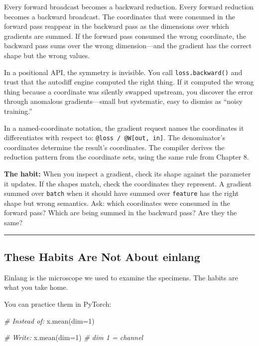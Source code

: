 \documentclass[11pt,]{article}
\newenvironment{Shaded}{}{}
\newcommand{\CommentTok}[1]{\textcolor[rgb]{0.38,0.63,0.69}{\textit{#1}}}
\newcommand{\DecValTok}[1]{\textcolor[rgb]{0.25,0.63,0.44}{#1}}
\newcommand{\NormalTok}[1]{#1}
\newcommand{\OperatorTok}[1]{\textcolor[rgb]{0.40,0.40,0.40}{#1}}
\begin{document}
Every forward broadcast becomes a backward reduction. Every forward
reduction becomes a backward broadcast. The coordinates that were
consumed in the forward pass reappear in the backward pass as the
dimensions over which gradients are summed. If the forward pass consumed
the wrong coordinate, the backward pass sums over the wrong
dimension---and the gradient has the correct shape but the wrong values.

In a positional API, the symmetry is invisible. You call
\texttt{loss.backward()} and trust that the autodiff engine computed the
right thing. If it computed the wrong thing because a coordinate was
silently swapped upstream, you discover the error through anomalous
gradients---small but systematic, easy to dismiss as ``noisy training.''

In a named-coordinate notation, the gradient request names the
coordinates it differentiates with respect to:
\texttt{@loss\ /\ @W{[}out,\ in{]}}. The denominator's coordinates
determine the result's coordinates. The compiler derives the reduction
pattern from the coordinate sets, using the same rule from Chapter 8.

\textbf{The habit:} When you inspect a gradient, check its shape against
the parameter it updates. If the shapes match, check the coordinates
they represent. A gradient summed over \texttt{batch} when it should
have summed over \texttt{feature} has the right shape but wrong
semantics. Ask: which coordinates were consumed in the forward pass?
Which are being summed in the backward pass? Are they the same?

\begin{center}\rule{0.5\linewidth}{0.4pt}\end{center}

\hypertarget{these-habits-are-not-about-einlang}{%
\subsection{These Habits Are Not About
einlang}\label{these-habits-are-not-about-einlang}}

Einlang is the microscope we used to examine the specimens. The habits
are what you take home.

You can practice them in PyTorch:

\begin{Shaded}
\begin{Highlighting}[]
\CommentTok{# Instead of:}
\NormalTok{x.mean(dim}\OperatorTok{=}\DecValTok{1}\NormalTok{)}

\CommentTok{# Write:}
\NormalTok{x.mean(dim}\OperatorTok{=}\DecValTok{1}\NormalTok{)  }\CommentTok{# dim 1 = channel}
\end{Highlighting}
\end{Shaded}
\end{document}
